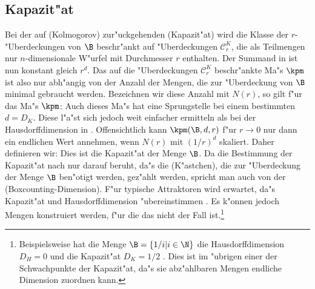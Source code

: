 \subsection{Kapazit"at}
\label{chapcapacity}
Bei der auf \autor(Kolmogorov) zur"uckgehenden \begriff(Kapazit"at) wird die Klasse der
$r$-"Uberdeckungen von $\B$ beschr"ankt auf "Uberdeckungen $\mathcal C^K_r$, die als Teilmengen nur
$n$-dimensionale W"urfel mit Durchmesser $r$ enthalten. Der Summand in
 ist nun konstant gleich $r^d$. Das auf die "Uberdeckungen $\mathcal C^K_r$
beschr"ankte Ma"s $\kpm$ ist also nur abh"angig von der Anzahl der Mengen, die zur "Uberdeckung
von $\B$ minimal gebraucht werden. Bezeichnen wir diese Anzahl mit $N(r)$, so gilt f"ur das
Ma"s $\kpm$:
Auch dieses Ma"s hat eine Sprungstelle bei einem bestimmten $d=D_K$. Diese l"a"st sich 
jedoch weit einfacher ermitteln als bei der Hausdorffdimension in
. Offensichtlich kann $\kpm(\B,d,r)$ f"ur $r\to0$ nur dann ein
endlichen Wert annehmen, wenn $N(r)$ mit $(1/r)^d$ skaliert. Daher definieren wir:
Dies ist die Kapazit"at der Menge $\B$. Da die Bestimmung der Kapazit"at nach
 nur darauf beruht, da"s die \naja(K"astchen), die zur "Uberdeckung der
Menge $\B$ ben"otigt werden, gez"ahlt werden, spricht man auch von der
\begriff(Boxcounting-Dimension). F"ur typische Attraktoren
wird erwartet, da"s Kapazit"at und Hausdorffdimension "ubereinstimmen
\cite{Farmer-ott-yorke}. Es k"onnen jedoch Mengen konstruiert werden, f"ur die das nicht der 
Fall ist.\footnote{Beispielsweise hat die Menge $\B=\{1/i\vert i\in\N\}$ die 
Hausdorffdimension $D_H=0$ und die Kapazit"at $D_K=1/2$ \cite{Leven89}. Dies ist im "ubrigen einer der
Schwachpunkte der Kapazit"at, da"s sie abz"ahlbaren Mengen endliche Dimension zuordnen kann.}

